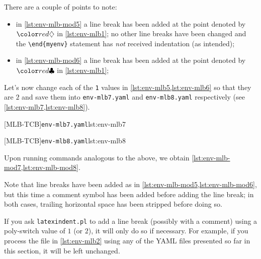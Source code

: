 There are a couple of points to note:
\begin{itemize}
  \item in \cref{lst:env-mlb-mod5} a line break has been added at the point denoted by $\EndStartsOnOwnLine$ in \vref{lst:env-mlb1}; no 
    other line breaks have been changed and the \lstinline!\end{myenv}! statement has \emph{not} received indentation (as intended);
  \item in \cref{lst:env-mlb-mod6} a line break has been added at the point denoted by $\EndFinishesWithLineBreak$ in \vref{lst:env-mlb1}; 
\end{itemize}

Let's now change each of the \texttt{1} values in \cref{lst:env-mlb5,lst:env-mlb6} so that they are $2$ and 
save them into \texttt{env-mlb7.yaml} and \texttt{env-mlb8.yaml} respectively (see \cref{lst:env-mlb7,lst:env-mlb8}).

\begin{minipage}{.49\textwidth}
[MLB-TCB]{\texttt{env-mlb7.yaml}}{lst:env-mlb7}
\end{minipage}
\hfill
\begin{minipage}{.49\textwidth}
[MLB-TCB]{\texttt{env-mlb8.yaml}}{lst:env-mlb8}
\end{minipage}

Upon running  commands analogous to the above, we obtain \cref{lst:env-mlb-mod7,lst:env-mlb-mod8}.

\begin{sidebyside}
\begin{minipage}{.42\linewidth}
\end{minipage}
\hfill
\begin{minipage}{.57\linewidth}
\end{minipage}
\end{sidebyside}

Note that line breaks have been added as in \cref{lst:env-mlb-mod5,lst:env-mlb-mod6}, but this time a comment symbol
has been added before adding the line break; in both cases, trailing horizontal 
space has been stripped before doing so.

If you ask \texttt{latexindent.pl} to add a line break (possibly with a comment) using a poly-switch value of $1$ (or $2$),
it will only do so if necessary. For example, if you process the file in \cref{lst:env-mlb2} using any of the YAML 
files presented so far in this section, it will be left unchanged.

